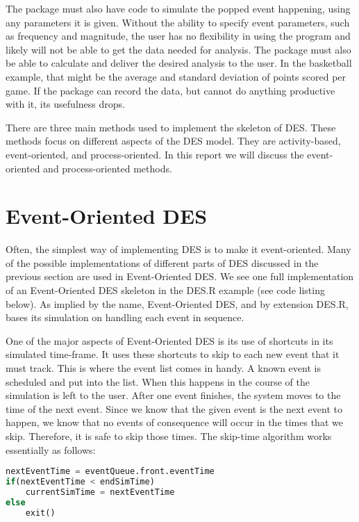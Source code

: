 \documentclass[a4paper, 11pt]{article} %
\begin{document}
The package must also have code to simulate the popped event happening, using any parameters it is given. Without the ability to specify event parameters, such as frequency and magnitude, the user has no flexibility in using the program and likely will not be able to get the data needed for analysis. The package must also be able to calculate and deliver the desired analysis to the user. In the basketball example, that might be the average and standard deviation of points scored per game. If the package can record the data, but cannot do anything productive with it, its usefulness drops.

There are three main methods used to implement the skeleton of DES. These methods focus on different aspects of the DES model. They are activity-based, event-oriented, and process-oriented. In this report we will discuss the event-oriented and process-oriented methods.


\section{Event-Oriented DES}

Often, the simplest way of implementing DES is to make it event-oriented. Many of the possible implementations of different parts of DES discussed in the previous section are used in Event-Oriented DES. We see one full implementation of an Event-Oriented DES skeleton in the DES.R example (see code listing below). As implied by the name, Event-Oriented DES, and by extension DES.R, bases its simulation on handling each event in sequence. 

One of the major aspects of Event-Oriented DES is its use of shortcuts in its simulated time-frame. It uses these shortcuts to skip to each new event that it must track. This is where the event list comes in handy. A known event is scheduled and put into the list. When this happens in the course of the simulation is left to the user. After one event finishes, the system moves to the time of the next event. Since we know that the given event is the next event to happen, we know that no events of consequence will occur in the times that we skip. Therefore, it is safe to skip those times. The skip-time algorithm works essentially as follows: \newline

\begin{lstlisting}[language=Python,caption=Skip Time Algorithm]
nextEventTime = eventQueue.front.eventTime
if(nextEventTime < endSimTime)
	currentSimTime = nextEventTime
else
	exit()
\end{lstlisting}
\end{document}
